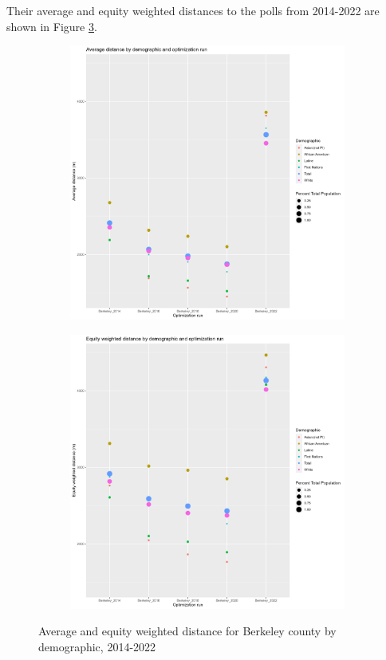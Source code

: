 \documentclass[11pt]{article}
\theoremstyle{remark}
\theoremstyle{definition}
\begin{document}
Their average and equity weighted distances to the polls from 2014-2022 are shown in Figure \ref{fig:Berkeley distance graphs}.

\begin{figure}
	\begin{subfigure}{.8\textwidth}
		\centering
		\includegraphics[width=.8\linewidth]{result_analysis/Berkeley_County_SC_original_configs/orig_pop_scaled_avg}
		\label{sfig:Berkeley avg dist}
	\end{subfigure} \newline
	\begin{subfigure}{.8\textwidth}
		\centering
		\includegraphics[width=.8\linewidth]{result_analysis/Berkeley_County_SC_original_configs/orig_pop_scaled_y_EDE}
		\label{sfig:Berkeley equity dist}
	\end{subfigure}
	\caption{Average and equity weighted distance for Berkeley county by demographic, 2014-2022}
	\label{fig:Berkeley distance graphs}
\end{figure}
\end{document}
